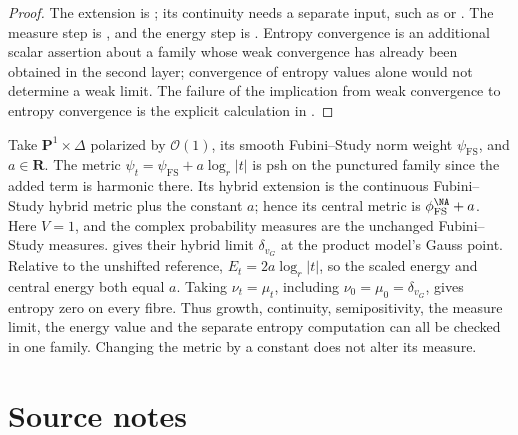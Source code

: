 \begin{proof}
The extension is ; its continuity needs a
separate input, such as  or
. The measure step is
, and the energy step is
. Entropy convergence
is an additional scalar assertion about a family whose weak convergence
has already been obtained in the second layer; convergence of entropy
values alone would not determine a weak limit. The failure of the implication from weak convergence to entropy
convergence is the explicit calculation in
.
\end{proof}

\begin{example}
\label{ex:hybrid-safe-procedure}
Take $\mathbf P^1\times\Delta$ polarized by $\mathcal O(1)$, its smooth Fubini--Study norm weight $\psi_{\mathrm{FS}}$, and $a\in\mathbf R$. The metric $\psi_t=\psi_{\mathrm{FS}}+a\log_r|t|$ is psh on the punctured family since the added term is harmonic there. Its hybrid extension is the continuous Fubini--Study hybrid metric plus the constant $a$; hence its central metric is $\phi_{\mathrm{FS}}^{\NA}+a$. Here $V=1$, and the complex probability measures are the unchanged Fubini--Study measures.  gives their hybrid limit $\delta_{v_G}$ at the product model's Gauss point. Relative to the unshifted reference, $E_t=2a\log_r|t|$, so the scaled energy and central energy both equal $a$. Taking $\nu_t=\mu_t$, including $\nu_0=\mu_0=\delta_{v_G}$, gives entropy zero on every fibre. Thus growth, continuity, semipositivity, the measure limit, the energy value and the separate entropy computation can all be checked in one family. Changing the metric by a constant does not alter its measure.
\end{example}

\section*{Source notes}
\label{sec:hybrid-source-notes}

